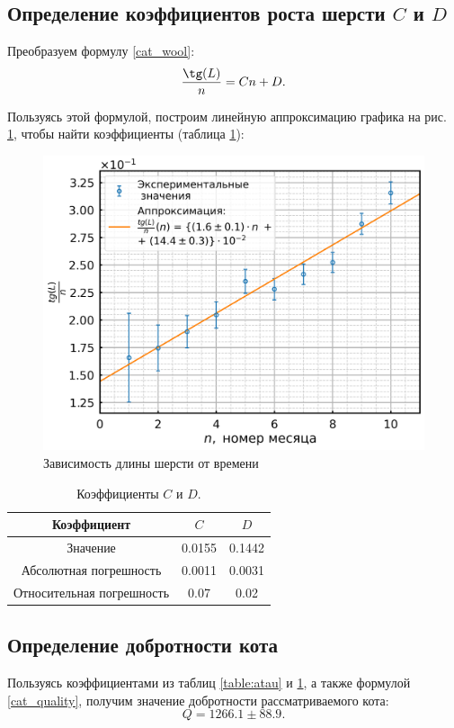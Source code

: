 \documentclass[12pt,a4paper]{article}
\begin{document}
\newpage
\subsection{Определение коэффициентов роста шерсти $C$ и $D$}
Преобразуем формулу \eqref{cat_wool}:
\[ \frac{\tg(L)}{n} = Cn + D. \]

Пользуясь этой формулой, построим линейную аппроксимацию графика на рис. \ref{fig_2}, чтобы найти коэффициенты (таблица \ref{table:cd}):

\begin{figure}[h!]
    \begin{center}
    		\includegraphics[scale=0.55]{plot_2.png}
    \caption{Зависимость длины шерсти от времени}\label{fig_2}
    \end{center}
\end{figure}

\begin{table}[h!]
    \centering
    \caption{Коэффициенты $C$ и $D$.}\label{table:cd}
	\begin{tabular}{ |c|c|c|}
 \hline
Коэффициент & $C$ & $D$ \\
 \hline
 Значение & 0.0155 & 0.1442 \\ \hline
 Абсолютная погрешность & 0.0011 & 0.0031 \\ \hline
 Относительная погрешность & 0.07 & 0.02 \\ \hline
	\end{tabular}

\end{table}

\subsection{Определение добротности кота}
Пользуясь коэффициентами из таблиц \ref{table:atau} и \ref{table:cd}, а также формулой \eqref{cat_quality}, получим значение добротности рассматриваемого кота:
\[ Q = 1266.1 \pm 88.9 .\]
\end{document}
